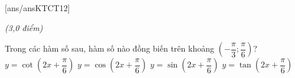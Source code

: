 \begin{name}
	{\tenchude}
	{\tendethi}
	{\tentruong}
	{\thoigian}
\end{name} 
[ans/ansKTCT12]

\TN \textit{(3,0 điểm)}

\begin{ex}%
Trong các hàm số sau, hàm số nào đồng biến trên khoảng $\left(-\dfrac{\pi}{3};\dfrac{\pi}{6}\right)$?
\choice
{$y=\cot \left(2x+\dfrac{\pi}{6}\right)$}
{$y=\cos \left(2x+\dfrac{\pi}{6}\right)$}
{\True $y=\sin \left(2x+\dfrac{\pi}{6}\right)$}
{$y=\tan \left(2x+\dfrac{\pi}{6}\right)$}
\end{ex}

